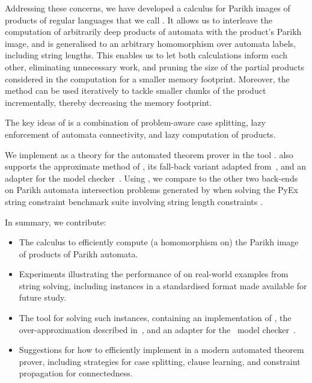 \documentclass[acmsmall,review,anonymous,screen]{acmart}\settopmatter{printfolios=true,printccs=true,printacmref=true}
\theoremstyle{definition}
\begin{document}
Addressing these concerns, we have developed a calculus for Parikh images of
products of regular languages that we call \Calculus{}. It allows us to
interleave the computation of arbitrarily deep products of automata with the
product's Parikh image, and is generalised to an arbitrary homomorphism over
automata labels, including string lengths. This enables us to let both
calculations inform each other, eliminating unnecessary work, and pruning the
size of the partial products considered in the computation for a smaller memory
footprint. Moreover, the method can be used iteratively to tackle smaller chunks
of the product incrementally, thereby decreasing the memory footprint.

The key ideas of \Calculus{} is a combination of problem-aware case splitting,
lazy enforcement of automata connectivity, and lazy computation of products.

We implement \Calculus{} as a theory for the \Princess{} automated theorem
prover in the tool \Catra. \Catra{} also supports the approximate method of
\cite{approximate-parikh}, its fall-back variant adapted
from~\cite{generate-parikh-image}, and an adapter for the \Nuxmv{} model
checker~\cite{nuxmv}. Using \Catra, we compare \Calculus{} to the other two
back-ends on \NrBenchmarks{} Parikh automata intersection problems generated by
\OstrichPlus{} when solving the PyEx string constraint benchmark suite involving
string length constraints \cite{pyex}.

In summary, we contribute:
\begin{itemize}
\item The \Calculus{} calculus to efficiently compute (a homomorphism on) the
Parikh image of products of Parikh automata.
\item Experiments illustrating the performance of \Calculus{} on real-world examples from string solving, including \NrBenchmarks{} instances in a standardised format made available for future study.
\item The \Catra{} tool for solving such instances, containing an implementation of \Calculus{}, the over-approximation described in~\cite{approximate-parikh}, and an adapter for the~\Nuxmv{} model checker~\cite{nuxmv}.
\item Suggestions for how to efficiently implement \Calculus{} in a modern automated theorem prover, including strategies for case splitting, clause learning, and constraint propagation for connectedness.
\end{itemize}
\end{document}
